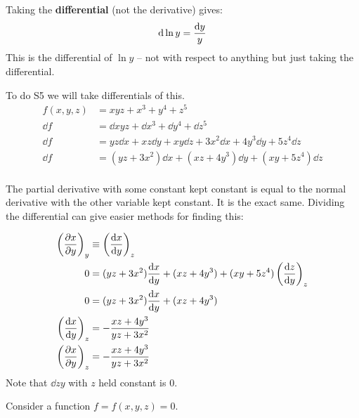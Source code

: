 \documentclass[10pt,\jkfside,a4paper]{article}
\begin{document}
Taking the \textbf{differential} (not the derivative) gives:
\begin{equation}
\dd{\ln y} = \frac{\dd{y}}{y} \\
\end{equation}
This is the differential of $\ln y$ -- not with respect to anything but just taking the differential.

To do S5 we will take differentials of this.
\begin{equation}
\begin{split}
f(x, y, z) &= xyz + x^3 + y^4 + z^5 \\
\dd{f} &= \dd{xyz} + \dd{x^3} + \dd{y^4} + \dd{z^5} \\
\dd{f} &= yz\dd{x} + xz\dd{y} + xy\dd{z} + 3x^2\dd{x} + 4y^3\dd{y} + 5z^4\dd{z} \\
\dd{f} &= (yz + 3x^2)\dd{x} + (xz + 4y^3)\dd{y} + (xy + 5z^4)\dd{z} \\
\end{split}
\end{equation}

The partial derivative with some constant kept constant is equal to the normal derivative with the 
other variable kept constant. It is the exact same. Dividing the differential can give easier methods 
for finding this:

\begin{equation}
\begin{split}
\left(\pdv{x}{y}\right)_y &\equiv \left(\dv{x}{y}\right)_z \\
0 &= (yz + 3x^2)\dv{x}{y} + (xz + 4y^3) + (xy + 5z^4)\left(\dv{z}{y}\right)_z \\
0 &= (yz + 3x^2)\dv{x}{y} + (xz + 4y^3) \\
\left(\dv{x}{y}\right)_z &= -\frac{xz + 4y^3}{yz + 3x^2} \\
\left(\pdv{x}{y}\right)_z &= -\frac{xz + 4y^3}{yz + 3x^2} \\
\end{split}
\end{equation}
Note that $\dd{z}{y}$ with $z$ held constant is 0.

Consider a function $f = f(x, y, z) = 0$.
\end{document}
